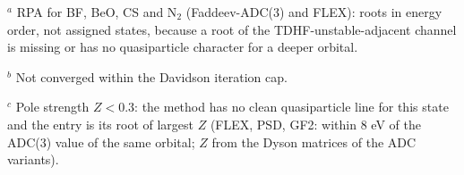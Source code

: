 \begin{table}[hbt!]
\begin{tabular}{lcccccccccccccccccccccc}
\bottomrule
\end{tabular}
\par\smallskip
{\raggedright\scriptsize
$^a$ RPA for BF, BeO, CS and N$_2$ (Faddeev-ADC(3) and FLEX): roots in energy order, not assigned states, because a root of the TDHF-unstable-adjacent channel is missing or has no quasiparticle character for a deeper orbital.\par
$^b$ Not converged within the Davidson iteration cap.\par
$^c$ Pole strength $Z<0.3$: the method has no clean quasiparticle line for this state and the entry is its root of largest $Z$ (FLEX, PSD, GF2: within 8 eV of the ADC(3) value of the same orbital; $Z$ from the Dyson matrices of the ADC variants).\par
}
\end{table}


